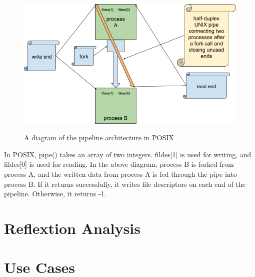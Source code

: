 \documentclass[12pt, dvipsnames, a4paper]{article}
\begin{document}
\begin{figure}[hbt!]
  \centering
  \includegraphics[width=570pt]{assets/localipc2.png}
  \caption{A diagram of the pipeline architecture in POSIX} \cite{rytarowski}
\end{figure}

In POSIX, pipe() takes an array of two integers. fildes[1] is used for writing, and fildes[0] is used for reading. In the above diagram, process B is forked from process A, and the written data from process A is fed through the pipe into process B. If it returns successfully, it writes file descriptors on each end of the pipeline. Otherwise, it returns -1.

\section{Reflextion Analysis}

\clearpage
\section{Use Cases}
\end{document}
